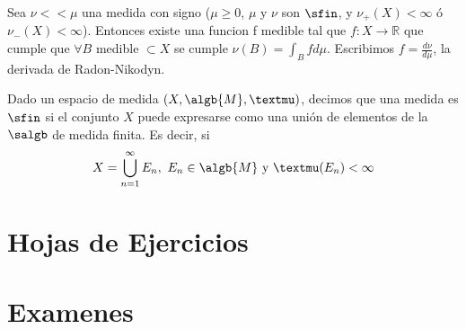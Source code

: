 \documentclass{apuntes}
\begin{document}
\begin{theorem}
Sea $\nu << \mu$ una medida con signo ($\mu \geq 0$, $\mu$ y $\nu$ son $\sfin$, y $\nu_+(X) < \infty$ ó $\nu_-(X) < \infty$). Entonces existe una funcion f medible tal que $f:X \rightarrow \mathbb{R}$ que cumple que $\forall B$ medible $\subset X$ se cumple $\nu(B)=\int_Bfd\mu$. Escribimos $f=\frac{d\nu}{d\mu}$, la derivada de Radon-Nikodyn. 
\end{theorem}

\begin{defn}\label{defSigmaFinita}
Dado un espacio de medida $(X, \algb{M}, µ)$, decimos que una medida es $\sfin$ si el conjunto $X$ puede expresarse como una unión de elementos de la $\salgb$ de medida finita. Es decir, si \[X=\bigcup_{n=1}^{\infty}E_n, \ E_n \in \algb{M} \text{ y }µ(E_n)< \infty\]
\end{defn}












%



\chapter{Hojas de Ejercicios}


\chapter{Examenes}

\end{document}
